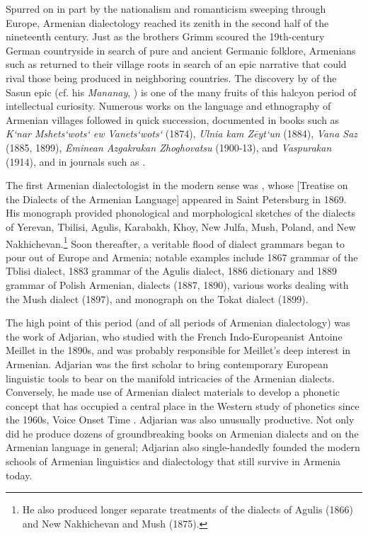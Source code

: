 Spurred on in part by the nationalism and romanticism sweeping through Europe, Armenian dialectology reached its zenith in the second half of the nineteenth century. Just as the brothers Grimm scoured the 19th-century German countryside in search of pure and ancient Germanic folklore, Armenians such as  returned to their village roots in search of an epic narrative that could rival those being produced in neighboring countries. The discovery by  of the Sasun epic (cf. his \textit{Mananay}, ) is one of the many fruits of this halcyon period of intellectual curiosity. Numerous works on the language and ethnography of Armenian villages followed in quick succession, documented in books such as  \textit{K‘nar Mshets‘wots‘ ew Vanets‘wots‘} (1874),  \textit{Ulnia kam Zēyt‘un} (1884),  \textit{Vana Saz} (1885, 1899),  \textit{Ēminean Azgakrakan Zhoghovatsu} (1900-13), and  \textit{Vaspurakan} (1914), and in journals such as .


The first Armenian dialectologist in the modern sense was , whose  [Treatise on the Dialects of the Armenian Language] appeared in Saint Petersburg in 1869. His monograph provided phonological and morphological sketches of the dialects of  Yerevan, Tbilisi, Agulis, Karabakh, Khoy, New Julfa, Mush, Poland, and New Nakhichevan.\footnote{He also produced longer separate treatments of the dialects of Agulis (1866) and New Nakhichevan and Mush (1875).} Soon thereafter, a veritable flood of dialect grammars began to pour out of Europe and Armenia; notable examples include  1867 grammar of the Tblisi dialect,  1883 grammar of the Agulis dialect,  1886 dictionary and 1889 grammar of Polish Armenian,  dialects (1887, 1890),  various works dealing with the Mush dialect (1897), and  monograph on the Tokat dialect (1899).


The high point of this period (and of all periods of Armenian dialectology) was the work of Adjarian, who studied with the French Indo-Europeanist Antoine Meillet in the 1890s, and was probably responsible for Meillet’s deep interest in Armenian. Adjarian was the first scholar to bring contemporary European linguistic tools to bear on the manifold intricacies of the Armenian dialects. Conversely, he made use of Armenian dialect materials to develop a phonetic concept that has occupied a central place in the Western study of phonetics since the 1960s, Voice Onset Time . Adjarian was also unusually productive. Not only did he produce dozens of groundbreaking books on Armenian dialects and on the Armenian language in general; Adjarian also single-handedly founded the modern schools of Armenian linguistics and dialectology that still survive in Armenia today.

